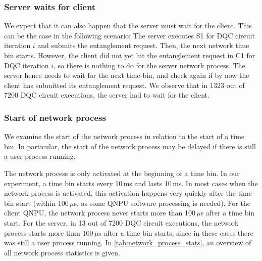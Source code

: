 \subsubsection{Server waits for client}

We expect that it can also happen that the server must wait for the client. This can be the case in the following scenario: The server executes S1 for \ac{DQC} circuit iteration $i$ and submits the entanglement request. Then, the next network time bin starts. However, the client did not yet hit the entanglement request in C1 for \ac{DQC} iteration $i$, so there is nothing to do for the server network process. The server hence needs to wait for the next time-bin, and check again if by now the client has submitted its entanglement request. We observe that in 1323 out of 7200 \ac{DQC} circuit executions, the server had to wait for the client.

\subsubsection{Start of network process}

We examine the start of the network process in relation to the start of a time bin. In particular, the start of the network process may be delayed if there is still a user process running. 

The network process is only activated at the beginning of a time bin. In our experiment, a time bin starts every 10\,ms and lasts 10\,ms. In most cases when the network process is activated, this activation happens very quickly after the time bin start (within 100\,$\mu$s, as some \ac{QNPU} software processing is needed). For the client \ac{QNPU}, the network process never starts more than 100\,$\mu$s after a time bin start. For the server, in 13 out of 7200 \ac{DQC} circuit executions, the network process starts more than 100\,$\mu$s after a time bin starts, since in these cases there was still a user process running. In \cref{tab:network_process_stats}, an overview of all network process statistics is given.

